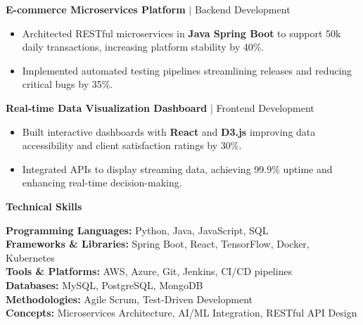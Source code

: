 \documentclass[a4paper,10pt]{article}
\begin{document}
\vspace{6pt}

\noindent
\textbf{E-commerce Microservices Platform} $|$ Backend Development \\
\begin{itemize}[leftmargin=*]
    \item Architected RESTful microservices in \textbf{Java Spring Boot} to support 50k daily transactions, increasing platform stability by 40\%.
    \item Implemented automated testing pipelines streamlining releases and reducing critical bugs by 35\%.
\end{itemize}

\vspace{6pt}

\noindent
\textbf{Real-time Data Visualization Dashboard} $|$ Frontend Development \\
\begin{itemize}[leftmargin=*]
    \item Built interactive dashboards with \textbf{React} and \textbf{D3.js} improving data accessibility and client satisfaction ratings by 30\%.
    \item Integrated APIs to display streaming data, achieving 99.9\% uptime and enhancing real-time decision-making.
\end{itemize}

\vspace{12pt}

\noindent
\textbf{Technical Skills}
\vspace{6pt}

\noindent
\textbf{Programming Languages:} Python, Java, JavaScript, SQL \\
\textbf{Frameworks \& Libraries:} Spring Boot, React, TensorFlow, Docker, Kubernetes \\
\textbf{Tools \& Platforms:} AWS, Azure, Git, Jenkins, CI/CD pipelines \\
\textbf{Databases:} MySQL, PostgreSQL, MongoDB \\
\textbf{Methodologies:} Agile Scrum, Test-Driven Development \\
\textbf{Concepts:} Microservices Architecture, AI/ML Integration, RESTful API Design
\end{document}
